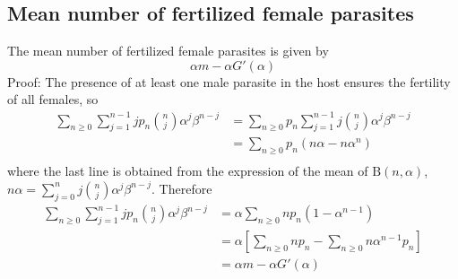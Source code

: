 \documentclass[bimj,fleqn]{w-art}
\theoremstyle{plain}
\theoremstyle{definition}
\begin{document}
\subsection{Mean number of fertilized female parasites}%
The mean number of fertilized female parasites is given by     
\begin{equation}\label{hembrasfecun}
\alpha  m - \alpha G'(\alpha)
\end{equation}
Proof: The presence of at least one male parasite in the host ensures the fertility of all females, so
\begin{equation*}
\begin{split}
\sum_{n\geq 0}\sum_{j=1}^{n-1}j p_n\binom{n}{j}\alpha^j\beta^{n-j}
&=\sum_{n\geq 0}p_n\sum_{j=1}^{n-1} j\binom{n}{j}\alpha^j\beta^{n-j}\\
&=\sum_{n\geq 0}p_n(n\alpha-n\alpha^n)\\
\end{split}
\end{equation*}
where the last line is obtained from the expression of the mean of $\mathrm{B}(n,\alpha)$, $n\alpha=\sum_{j=0}^{n} j\binom{n} {j}\alpha^j\beta^{n-j}$. Therefore
\begin{equation*}
\begin{split}
\sum_{n\geq 0}\sum_{j=1}^{n-1}jp_n\binom{n}{j}\alpha^j\beta^{n-j}
&=\alpha\sum_{n\geq 0}np_n(1-\alpha^{n-1})\\
&=\alpha \left[ \sum_{n\geq 0}np_n-\sum_{n\geq 0}n\alpha ^{n-1}p_n\right] \\
&= \alpha  m - \alpha G'(\alpha) 
\end{split}
\end{equation*}
\end{document}
